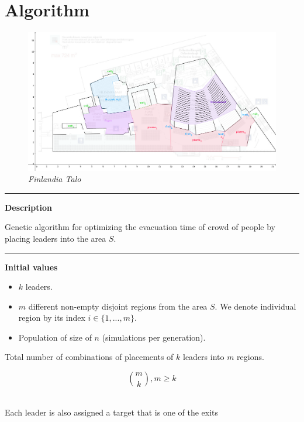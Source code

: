 \section{Algorithm}\label{algorithm}

\begin{figure}[htbp]
\centering
\includegraphics{./finlandia_talo.png}
\caption{\emph{Finlandia Talo}}
\end{figure}

\begin{center}\rule{0.5\linewidth}{\linethickness}\end{center}

\textbf{Description}

Genetic algorithm for optimizing the evacuation time of crowd of people
by placing leaders into the area \(S\).

\begin{center}\rule{0.5\linewidth}{\linethickness}\end{center}

\textbf{Initial values}

\begin{itemize}
\tightlist
\item
  \(k\) leaders.
\item
  \(m\) different non-empty disjoint regions from the area \(S\). We
  denote individual region by its index \(i ∈ \{1, ..., m\}\).
\item
  Population of size of \(n\) (simulations per generation).
\end{itemize}

Total number of combinations of placements of \(k\) leaders into \(m\)
regions.

\[ \binom{m}{k}, m ≥ k \]~

Each leader is also assigned a target that is one of the exits

